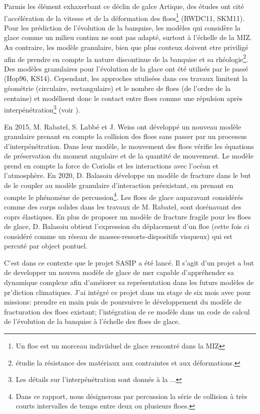 Parmis les élément exhaxerbant ce déclin de galce Artique, des études ont cité l'accélération de la vitesse et de la déformation des floes\footnote{Un floe est un morceau indiviiduel de glace rencontré dans la MIZ} (RWDC11, SKM11). Pour les prédiction de l'évolution de la banquise, les modèles qui considère la glace comme un milieu continu ne sont pas adapté, surtout à l'échelle de la MIZ. Au contraire, les modèle granulaire, bien que plus couteux doivent etre priviligé afin de prendre en compte la nature discontinue de la banquise et sa rhéologie\footnote{étudie la résistance des matériaux aux contraintes et aux déformations.}. Des modèles granulaires pour l'évolution de la glace ont été utilisés par le passé (Hop96, KS14). Cependant, les approches utulisées dans ces travaux limitent la géométrie (circulaire, rectangulaire) et le nombre de floes (de l'ordre de la centaine) et modélisent donc le contact entre floes comme une répulsion après interpénétration\footnote{Les détails sur l'interpénétration sont donnés à la ... } (voir \parencite[p.16]{balasoiu2020halthesis}). 

En 2015, M. Rabatel, S. Labbé et J. Weiss ont développé un nouveau modèle granulaire prenant en compte la collision des floes sans passer par un processus d’interpénétration. Dans leur modèle, le mouvement des floes vérifie les équations de préservation du moment angulaire et de la quantité de mouvement. Le modèle prend en compte la force de Coriolis et les interactions avec l’océan et l’atmosphère. En 2020, D. Balasoiu développe un modèle de fracture dans le but de le coupler au modèle granulaire d'interaction préexistant, en prenant en compte le phénomène de percussion\footnote{Dans ce rapport, nous désignerons par percussion la série de collision à très courts intervalles de temps entre deux ou plusieurs floes.}. Les floes de glace auparavant considérés comme des corps solides dans les travaux de M. Rabatel, sont dorénavant des coprs élastiques. En plus de proposer un modèle de fracture fragile pour les floes de glace, D. Balasoiu obtient l’expression du déplacement d'un floe (cette fois ci considéré comme un réseau de masses-ressorts-dispositifs visqueux) qui est percuté par object pontuel.

C'est dans ce contexte que le projet SASIP a été lancé. Il s'agit d'un projet a but de developper un nouvea modèle de glace de mer capable d'appréhender sa dynamique complexe afin d'améiorer sa représentation dans les futurs modèles de pr'diction climatiques. J'ai intégré ce projet dans un stage de six mois avec pour missions: prendre en main puis de poursuivre le développement du modèle de fracturation des floes existant; l’intégration de ce modèle dans un code de calcul de l’évolution de la banquise à l’échelle des floes de glace.

